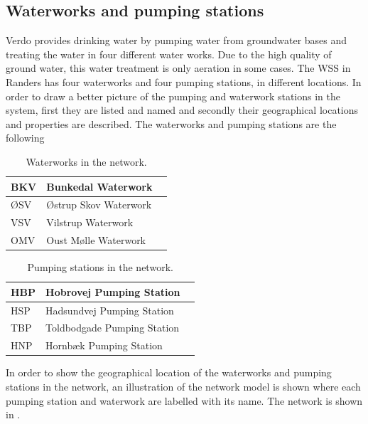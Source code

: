\subsection{Waterworks and pumping stations}
\label{waterworks_and_pumping_stations}

Verdo provides drinking water by pumping water from groundwater bases and treating the water in four different water works. Due to the high quality of ground water, this water treatment is only aeration in some cases. The WSS in Randers has four waterworks and four pumping stations, in different locations. In order to draw a better picture of the pumping and waterwork stations in the system, first they are listed and named and secondly their geographical locations and properties are described. The waterworks and pumping stations are the following

\begin{table}[H]
\begin{center}
    \begin{tabular}{| l | l | l |}
    \hline
    BKV & Bunkedal Waterwork   \\ \hline
    ØSV & Østrup Skov Waterwork  \\ \hline
    VSV & Vilstrup Waterwork  \\ \hline
    OMV & Oust Mølle Waterwork   \\
    \hline
    \end{tabular}
\end{center}
\caption{Waterworks in the network.}
\end{table}

\begin{table}[H]
\begin{center}
    \begin{tabular}{| l | l | l |}
    \hline
    HBP & Hobrovej Pumping Station   \\ \hline
    HSP & Hadsundvej Pumping Station  \\ \hline
    TBP & Toldbodgade Pumping Station  \\ \hline
    HNP & Hornbæk Pumping Station   \\
    \hline
    \end{tabular}
\end{center}
\caption{Pumping stations in the network.}
\end{table}

In order to show the geographical location of the waterworks and pumping stations in the network, an illustration of the network model is shown where each pumping station and waterwork are labelled with its name. The network is shown in .


